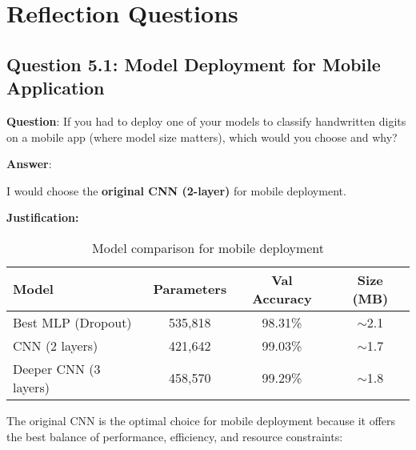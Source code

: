 \section{Reflection Questions}

\subsection{Question 5.1: Model Deployment for Mobile Application}

\textbf{Question}: If you had to deploy one of your models to classify handwritten digits on a mobile app (where model size matters), which would you choose and why?

\textbf{Answer}:

I would choose the \textbf{original CNN (2-layer)} for mobile deployment.

\textbf{Justification:}

\begin{table}[h]
\centering
\begin{tabular}{|l|c|c|c|}
\hline
\textbf{Model} & \textbf{Parameters} & \textbf{Val Accuracy} & \textbf{Size (MB)} \\ \hline
Best MLP (Dropout) & 535,818 & 98.31\% & $\sim$2.1 \\ \hline
CNN (2 layers) & 421,642 & 99.03\% & $\sim$1.7 \\ \hline
Deeper CNN (3 layers) & 458,570 & 99.29\% & $\sim$1.8 \\ \hline
\end{tabular}
\caption{Model comparison for mobile deployment}
\label{tab:mobile-deployment}
\end{table}

The original CNN is the optimal choice for mobile deployment because it offers the best balance of performance, efficiency, and resource constraints:

